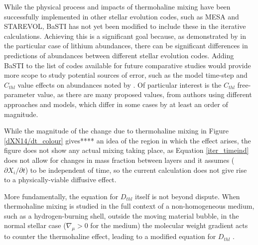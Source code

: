 \documentclass[12pt, a4paper]{report}
\begin{document}
While the physical process and impacts of thermohaline mixing have been successfully implemented in other stellar evolution codes, such as MESA and STAREVOL, BaSTI has not yet been modified to include these in the iterative calculations. Achieving this is a significant goal because, as demonstrated by \cite{2015MNRAS.446.2673L} in the particular case of lithium abundances, there can be significant differences in predictions of abundances between different stellar evolution codes. Adding BaSTI to the list of codes available for future comparative studies would provide more scope to study potential sources of error, such as the model time-step and $C_{thl}$ value effects on abundances noted by \cite{2015MNRAS.446.2673L}. Of particular interest is the $C_{thl}$ free-parameter value, as there are many proposed values, from authors using different approaches and models, which differ in some cases by at least an order of magnitude.

While the magnitude of the change due to thermohaline mixing in Figure \ref{dXN14/dt_colour} gives**** an idea of the region in which the effect arises, the figure does not show any actual mixing taking place, as Equation \ref{iter_timeind} does not allow for changes in mass fraction between layers and it assumes ($\partial X_{i}/\partial t$) to be independent of time, so the current calculation does not give rise to a physically-viable diffusive effect.
\cite{2010A&A...521A...9C}

More fundamentally, the equation for $D_{thl}$ itself is not beyond dispute. When thermohaline mixing is studied in the full context of a non-homogeneous medium, such as a hydrogen-burning shell, outside the moving material bubble, in the normal stellar case ($\nabla _{\mu} > 0$ for the medium) the molecular weight gradient acts to counter the thermohaline effect, leading to a modified equation for $D_{thl}$ \citep{2010ApJ...723..563D}.
\end{document}
